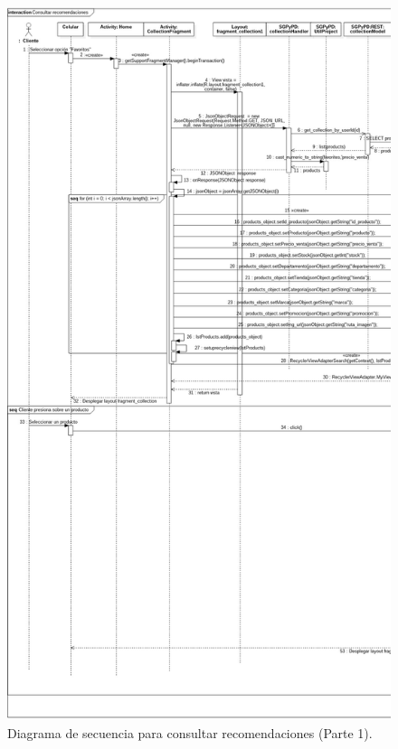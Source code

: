 \FloatBarrier
\begin{figure}[htbp!]
		\centering
			\includegraphics[width=.68 \textwidth]{imagenes/Diagramas_UserApp/Nuevos_diagramas/Recomendaciones1}
		\caption{Diagrama de secuencia para consultar recomendaciones (Parte 1).}
		\label{image:rec2}
\end{figure}
\FloatBarrier

